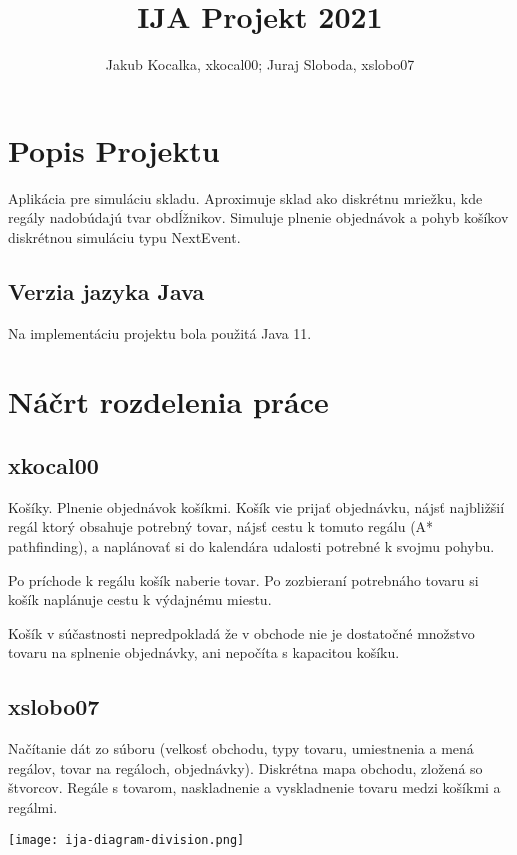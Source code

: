 \documentclass[10pt,a4paper]{article}
\author{Jakub Kocalka, xkocal00; Juraj Sloboda, xslobo07}
\title{IJA Projekt 2021}
\begin{document}
	\maketitle
	
	\section{Popis Projektu}
	Aplikácia pre simuláciu skladu. Aproximuje sklad ako diskrétnu mriežku, kde regály nadobúdajú tvar obdĺžnikov. Simuluje plnenie objednávok a pohyb košíkov diskrétnou simuláciu typu NextEvent.
	
	\subsection{Verzia jazyka Java}
	Na implementáciu projektu bola použitá Java 11.


	\section{Náčrt rozdelenia práce}
	\subsection{xkocal00}
	Košíky. Plnenie objednávok košíkmi. Košík vie prijať objednávku, nájsť najbližšií regál ktorý obsahuje potrebný tovar, nájsť cestu k tomuto regálu (A* pathfinding), a naplánovať si do kalendára udalosti potrebné k svojmu pohybu.
	
	Po príchode k regálu košík naberie tovar. Po zozbieraní potrebnáho tovaru si košík naplánuje cestu k výdajnému miestu.
	
	Košík v súčastnosti nepredpokladá že v obchode nie je dostatočné množstvo tovaru na splnenie objednávky, ani nepočíta s kapacitou košíku.
	
	\subsection{xslobo07} 
	Načítanie dát zo súboru (velkosť obchodu, typy tovaru, umiestnenia a mená regálov, tovar na regáloch, objednávky). Diskrétna mapa obchodu, zložená so štvorcov. Regále s tovarom, naskladnenie a vyskladnenie tovaru medzi košíkmi a regálmi.
	
	\begin{sidewaysfigure}[ht]
		\texttt{[image: ija-diagram-division.png]}
	\end{sidewaysfigure}
	
\end{document}
